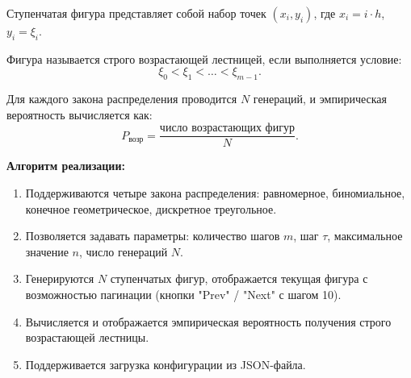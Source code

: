\documentclass[a4paper]{article}
\theoremstyle{definition}
\begin{document}
Ступенчатая фигура представляет собой набор точек $(x_i, y_i)$, где $x_i = i \cdot h$, $y_i = \xi_i$.

Фигура называется строго возрастающей лестницей, если выполняется условие:
\begin{equation}
    \xi_0 < \xi_1 < \dots < \xi_{m-1}. \tag{6.2}
\end{equation}

Для каждого закона распределения проводится $N$ генераций, и эмпирическая вероятность вычисляется как:
\begin{equation}
    P_{\text{возр}} = \frac{\text{число возрастающих фигур}}{N}. \tag{6.3}
\end{equation}

\textbf{Алгоритм реализации:}

\begin{enumerate}
    \item Поддерживаются четыре закона распределения: равномерное, биномиальное, конечное геометрическое, дискретное треугольное.
    \item Позволяется задавать параметры: количество шагов $m$, шаг $\tau$, максимальное значение $n$, число генераций $N$.
    \item Генерируются $N$ ступенчатых фигур, отображается текущая фигура с возможностью пагинации (кнопки "Prev" / "Next" с шагом 10).
    \item Вычисляется и отображается эмпирическая вероятность получения строго возрастающей лестницы.
    \item Поддерживается загрузка конфигурации из JSON-файла.
\end{enumerate}
\end{document}
